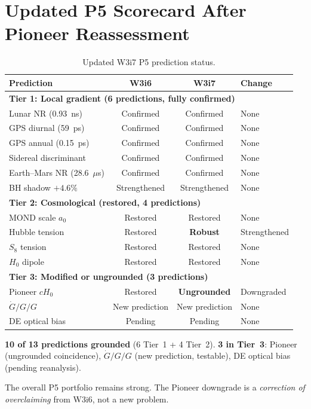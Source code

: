\documentclass[11pt]{article}
\newcommand{\Hzero}{H_0}
\newcommand{\aM}{a_0}
\newcommand{\Gdot}{\dot{G}/G}
\begin{document}
\section{Updated P5 Scorecard After Pioneer Reassessment}
\label{sec:P5-scorecard-update}

\begin{table}[H]
\centering
\caption{Updated W3i7 P5 prediction status.}
\begin{tabular}{p{3cm}ccl}
\toprule
\textbf{Prediction} & \textbf{W3i6} & \textbf{W3i7} & \textbf{Change} \\
\midrule
\multicolumn{4}{l}{\textbf{Tier 1: Local gradient (6 predictions, fully confirmed)}} \\
\midrule
Lunar NR (0.93~ns) & Confirmed & Confirmed & None \\
GPS diurnal (59~ps) & Confirmed & Confirmed & None \\
GPS annual (0.15~ps) & Confirmed & Confirmed & None \\
Sidereal discriminant & Confirmed & Confirmed & None \\
Earth--Mars NR (28.6~$\mu$s) & Confirmed & Confirmed & None \\
BH shadow $+4.6\%$ & Strengthened & Strengthened & None \\
\midrule
\multicolumn{4}{l}{\textbf{Tier 2: Cosmological (restored, 4 predictions)}} \\
\midrule
MOND scale $\aM$ & Restored & Restored & None \\
Hubble tension & Restored & \textbf{Robust} & Strengthened \\
$S_8$ tension & Restored & Restored & None \\
$\Hzero$ dipole & Restored & Restored & None \\
\midrule
\multicolumn{4}{l}{\textbf{Tier 3: Modified or ungrounded (3 predictions)}} \\
\midrule
Pioneer $c\Hzero$ & Restored & \textbf{Ungrounded} & Downgraded \\
$\Gdot/G$ & New prediction & New prediction & None \\
DE optical bias & Pending & Pending & None \\
\bottomrule
\end{tabular}
\end{table}

\begin{tcolorbox}[colback=yellow!5!white, colframe=yellow!60!black,
  title=\textbf{W3i7 P5 Net Assessment}]
\textbf{10 of 13 predictions grounded} (6 Tier~1 + 4 Tier~2).
\textbf{3 in Tier~3}: Pioneer (ungrounded coincidence), $\Gdot/G$
(new prediction, testable), DE optical bias (pending reanalysis).

The overall P5 portfolio remains strong. The Pioneer downgrade is
a \emph{correction of overclaiming} from W3i6, not a new problem.
\end{tcolorbox}
\end{document}
